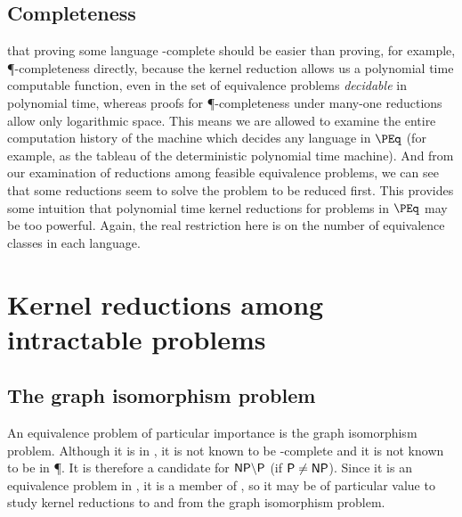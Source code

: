 \documentclass{article}
\theoremstyle{definition} \newtheorem{definition}[definition]{Definition}
\begin{document}

\subsection{Completeness}
that proving some language \PEq-complete should be easier than proving, for
example, \P-completeness directly, because the kernel reduction allows us a
polynomial time computable function, even in the set of equivalence problems
\emph{decidable} in polynomial time, whereas proofs for \P-completeness under
many-one reductions allow only logarithmic space. This means we are allowed to
examine the entire computation history of the machine which decides any
language in $\PEq$ (for example, as the tableau of the deterministic polynomial
time machine). And from our examination of reductions among feasible
equivalence problems, we can see that some reductions seem to solve the problem
to be reduced first. This provides some intuition that polynomial time kernel
reductions for problems in $\PEq$ may be too powerful. Again, the real
restriction here is on the number of equivalence classes in each language.



\section{Kernel reductions among intractable problems}

\subsection{The graph isomorphism problem}

An equivalence problem of particular importance is the graph isomorphism
problem. Although it is in \NP, it is not known to be \NP-complete and it is
not known to be in \P. It is therefore a candidate for ${\mathsf{NP}}\backslash{\ensuremath{\mathsf{P}}}$ (if
${\mathsf{P}}\neq{\ensuremath{\mathsf{NP}}}$). Since it is an equivalence problem in \NP, it is a member of
\NPEq, so it may be of particular value to study kernel reductions to and from
the graph isomorphism problem. 
\end{document}
